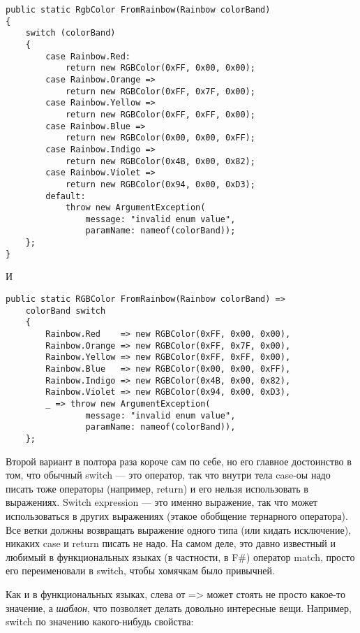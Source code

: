 \documentclass[a5paper]{article}
\begin{document}
\begin{verbatim}
public static RgbColor FromRainbow(Rainbow colorBand)
{ 
    switch (colorBand)
    {
        case Rainbow.Red: 
            return new RGBColor(0xFF, 0x00, 0x00);
        case Rainbow.Orange => 
            return new RGBColor(0xFF, 0x7F, 0x00);
        case Rainbow.Yellow => 
            return new RGBColor(0xFF, 0xFF, 0x00);
        case Rainbow.Blue => 
            return new RGBColor(0x00, 0x00, 0xFF);
        case Rainbow.Indigo => 
            return new RGBColor(0x4B, 0x00, 0x82);
        case Rainbow.Violet => 
            return new RGBColor(0x94, 0x00, 0xD3);
        default:
            throw new ArgumentException(
                message: "invalid enum value",
                paramName: nameof(colorBand));
    };
}
\end{verbatim}

И

\begin{verbatim}
public static RGBColor FromRainbow(Rainbow colorBand) =>
    colorBand switch
    {
        Rainbow.Red    => new RGBColor(0xFF, 0x00, 0x00),
        Rainbow.Orange => new RGBColor(0xFF, 0x7F, 0x00),
        Rainbow.Yellow => new RGBColor(0xFF, 0xFF, 0x00),
        Rainbow.Blue   => new RGBColor(0x00, 0x00, 0xFF),
        Rainbow.Indigo => new RGBColor(0x4B, 0x00, 0x82),
        Rainbow.Violet => new RGBColor(0x94, 0x00, 0xD3),
        _ => throw new ArgumentException(
                message: "invalid enum value", 
                paramName: nameof(colorBand)),
    };
\end{verbatim}

Второй вариант в полтора раза короче сам по себе, но его главное достоинство в том, что обычный switch --- это оператор, так что внутри тела case-оы надо писать тоже операторы (например, return) и его нельзя использовать в выражениях. Switch expression --- это именно выражение, так что может использоваться в других выражениях (этакое обобщение тернарного оператора). Все ветки должны возвращать выражение одного типа (или кидать исключение), никаких case и return писать не надо. На самом деле, это давно известный и любимый в функциональных языках (в частности, в F\#) оператор match, просто его переименовали в switch, чтобы хомячкам было привычней.

Как и в функциональных языках, слева от => может стоять не просто какое-то значение, а \textit{шаблон}, что позволяет делать довольно интересные вещи. Например, switch по значению какого-нибудь свойства:
\end{document}
